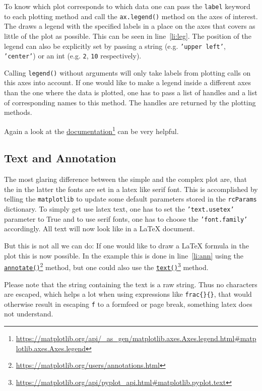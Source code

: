 \documentclass[a4paper, 11pt, onecolumn]{article}
\newcommand{\mpl}{\texttt{matplotlib}\xspace}
\newcommand{\pl}[1]{\mbox{\texttt{#1}\xspace}}
\newcommand{\latex}{\LaTeX\xspace}
\newcommand{\fref}[2]{\href{#1}{#2}\footnote{\url{#1}}}
\newcommand{\baseref}[3]{\mbox{#1 \ref{#2:#3}\xspace}}
\newcommand{\lin}[1]{\baseref{line}{li}{#1}}
\begin{document}
To know which plot corresponds to which data one can pass the \pl{label} 
keyword to each plotting method and call the \pl{ax.legend()} method on the
axes of interest. The draws a legend with the specified labels in a place on
the axes that covers as little of the plot as possible. This can be seen in
\lin{leg}. The position of the legend can also be explicitly set by 
passing a string (e.g. \pl{'upper left'}, \pl{'center'}) or an int (e.g.
\pl{2}, \pl{10} respectively).

Calling \pl{legend()} without arguments will only take labels from plotting
calls on this axes into account. If one would like to make a legend inside a
different axes than the one where the data is plotted, one has to pass a list
of handles and a list of corresponding names to this method. The handles are
returned by the plotting methods.

Again a look at the \fref{https://matplotlib.org/api/\_as\_gen/matplotlib.axes.Axes.legend.html\#matplotlib.axes.Axes.legend}{documentation}
can be very helpful.


\subsection{Text and Annotation}

The most glaring difference between the simple and the complex plot are, that 
the in the latter the fonts are set in a latex like serif font. This is
accomplished by telling the \mpl to update some default parameters stored
in the \pl{rcParams} dictionary. To simply get use latex text, one has to set
the \pl{'text.usetex'} parameter to True and to use serif fonts, one has to
choose the \pl{'font.family'} accordingly. All text will now look like in a
\latex document.

But this is not all we can do: If one would like to draw a \latex formula in
the plot this is now possible. In the example this is done in \lin{ann}
using the \fref{https://matplotlib.org/users/annotations.html}{\pl{annotate()}}
method, but one could also use the
\fref{https://matplotlib.org/api/pyplot\_api.html\#matplotlib.pyplot.text}{\pl{text()}} method.

Please note that the string containing the text is a raw string. Thus no 
characters are escaped, which helps a lot when using expressions like
\pl{\\frac\{\}\{\}}, that would otherwise result in escaping \pl{\\f} to a
formfeed or page break, something latex does not understand.
\end{document}
